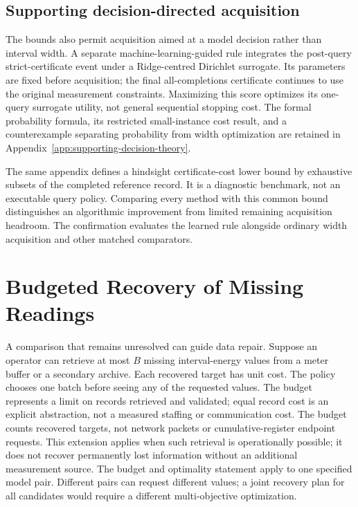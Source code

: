 \documentclass[12pt]{article}
\begin{document}
\subsection{Supporting decision-directed acquisition}
The bounds also permit acquisition aimed at a model decision rather than
interval width. A separate machine-learning-guided rule integrates the
post-query strict-certificate event under a Ridge-centred Dirichlet
surrogate. Its parameters are fixed before acquisition; the final
all-completions certificate continues to use the original measurement
constraints. Maximizing this score optimizes its one-query surrogate
utility, not general sequential stopping cost. The formal probability
formula, its restricted small-instance cost result, and a counterexample
separating probability from width optimization are retained in
Appendix~\ref{app:supporting-decision-theory}.

The same appendix defines a hindsight certificate-cost lower bound by
exhaustive subsets of the completed reference record. It is a diagnostic
benchmark, not an executable query policy. Comparing every method with
this common bound distinguishes an algorithmic improvement from limited
remaining acquisition headroom. The confirmation evaluates the learned
rule alongside ordinary width acquisition and other matched comparators.

\section{Budgeted Recovery of Missing Readings}
A comparison that remains unresolved can guide data repair.
Suppose an operator can retrieve at most $B$ missing interval-energy values
from a meter buffer or a secondary archive. Each recovered target has unit
cost. The policy chooses one batch before seeing any of the requested
values. The budget represents a limit on records retrieved and validated;
equal record cost is an explicit abstraction, not a measured staffing or
communication cost. The budget counts recovered targets, not network packets or
cumulative-register endpoint requests. This extension applies when such
retrieval is operationally possible; it does not recover permanently lost
information without an additional measurement source. The budget and
optimality statement apply to one specified model pair. Different pairs
can request different values; a joint recovery plan for all candidates
would require a different multi-objective optimization.
\end{document}
